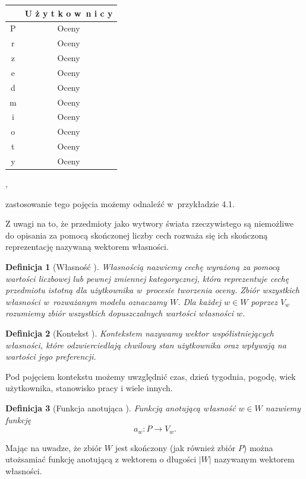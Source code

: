 \documentclass[12pt,a4paper]{report}
\newtheorem{df}{Definicja}[chapter]
\newcommand{\setPrzedmioty}{\mathit{P}}
\newcommand{\setWlasnosci}{\mathit{W}}
\begin{document}
\begin{center}
\begin{tabular}{|c|c|} \hline
 & U ż y t k o w~n i c y  \\
\hline
\hline
P & Oceny \\
\hline
r & Oceny \\
\hline
z & Oceny  \\
\hline
e & Oceny \\
\hline
d & Oceny \\
\hline
m & Oceny \\
\hline
i & Oceny \\
\hline
o & Oceny \\
\hline
t & Oceny \\
\hline
y & Oceny \\
\hline
\end{tabular},
\end{center}
zastosowanie tego pojęcia możemy odnaleźć w~przykładzie 4.1.
\bigskip

Z uwagi na to, że przedmioty jako wytwory świata rzeczywistego są niemożliwe do opisania za pomocą skończonej liczby cech  rozważa się ich skończoną reprezentację nazywaną wektorem własności.

\begin{df}[Własność {\citep[Sec 1.3]{kidzinski}}]
Własnością nazwiemy cechę wyrażoną za pomocą wartości liczbowej lub pewnej zmiennej kategorycznej, która reprezentuje cechę przedmiotu istotną dla użytkownika w~procesie tworzenia oceny. Zbiór wszystkich własności w~rozważanym modelu oznaczamy $\setWlasnosci$. Dla każdej $w \in \setWlasnosci$ poprzez $V_w$ rozumiemy zbiór wszystkich dopuszczalnych wartości własności $w$.
\end{df}

\begin{df}[Kontekst {\citep[Sec 3]{bre}}]
Kontekstem nazywamy wektor współistniejących własności, które odzwierciedlają chwilowy stan użytkownika oraz wpływają na wartości jego preferencji.
\end{df}

Pod pojęciem kontekstu możemy uwzględnić czas, dzień tygodnia, pogodę, wiek użytkownika, stanowisko pracy i wiele innych.

\begin{df}[Funkcja anotująca {\citep[Sec 1.3]{kidzinski}}]
Funkcją anotującą własność $w \in \setWlasnosci$ nazwiemy funkcję 
$$
a_w \colon \setPrzedmioty \to V_w.
$$
\end{df}

Mając na uwadze, że zbiór $\setWlasnosci$ jest skończony (jak również zbiór $\setPrzedmioty$) można utożsamiać funkcję anotującą z wektorem o długości $|\setWlasnosci|$ nazywanym wektorem własności.
\end{document}
